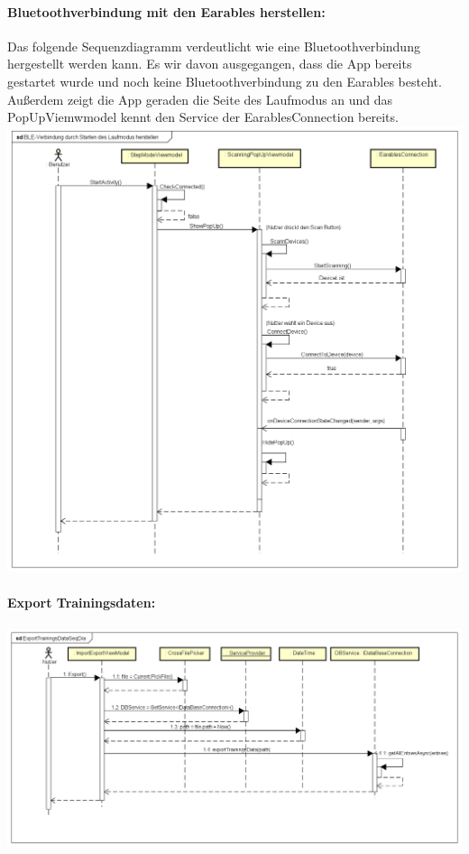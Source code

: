 \documentclass[a4paper,12pt]{article}
\begin{document}
\paragraph{Bluetoothverbindung mit den Earables herstellen:}
Das folgende Sequenzdiagramm verdeutlicht wie eine Bluetoothverbindung hergestellt werden kann. Es wir davon ausgegangen, dass die App bereits gestartet wurde und noch keine Bluetoothverbindung zu den Earables besteht. Außerdem zeigt die App geraden die Seite des Laufmodus an und das PopUpViemwmodel kennt den Service der EarablesConnection bereits.\\





\includegraphics[width=1.1\textwidth]{./Diagramme/Verbindungsaufbausequenzdiagramm.png}

\paragraph{Export Trainingsdaten:}
\includegraphics[width=1.1\textwidth]{./Diagramme/TrainingsDatenExport_Sequenz.png}
\end{document}
